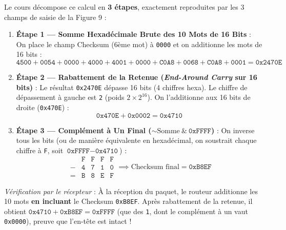 \documentclass[11pt,a4paper]{article}
\begin{document}
Le cours décompose ce calcul en \textbf{3 étapes}, exactement reproduites par les 3 champs de saisie de la Figure 9 :
\begin{enumerate}
    \item \textbf{Étape 1 — Somme Hexadécimale Brute des 10 Mots de 16 Bits} :
    On place le champ Checksum (6ème mot) à \texttt{0000} et on additionne les mots de 16 bits :
    $$\texttt{4500} + \texttt{0054} + \texttt{0000} + \texttt{4000} + \texttt{4001} + \texttt{0000} + \texttt{C0A8} + \texttt{0068} + \texttt{C0A8} + \texttt{0001} = \mathbf{\texttt{0x2470E}}$$
    \item \textbf{Étape 2 — Rabattement de la Retenue (\textit{End-Around Carry} sur 16 bits)} :
    Le résultat \texttt{0x2470E} dépasse 16 bits (4 chiffres hexa). Le chiffre de dépassement à gauche est \texttt{2} (poids $2 \times 2^{16}$). On l'additionne aux 16 bits de droite (\texttt{0x470E}) :
    $$\texttt{0x470E} + \texttt{0x0002} = \mathbf{\texttt{0x4710}}$$
    \item \textbf{Étape 3 — Complément à Un Final ($\sim\text{Somme} \ \& \ \texttt{0xFFFF}$)} :
    On inverse tous les bits (ou de manière équivalente en hexadécimal, on soustrait chaque chiffre à \texttt{F}, soit $\texttt{0xFFFF} - \texttt{0x4710}$) :
    $$\begin{array}{cccccc}
      & \texttt{F} & \texttt{F} & \texttt{F} & \texttt{F} \\
    - & \texttt{4} & \texttt{7} & \texttt{1} & \texttt{0} \\
    \hline
    = & \mathbf{\texttt{B}} & \mathbf{\texttt{8}} & \mathbf{\texttt{E}} & \mathbf{\texttt{F}}
    \end{array}
    \implies \text{Checksum final} = \mathbf{\texttt{0xB8EF}}$$
\end{enumerate}
\textit{Vérification par le récepteur} : À la réception du paquet, le routeur additionne les 10 mots \textbf{en incluant} le Checksum \texttt{0xB8EF}. Après rabattement de la retenue, il obtient $\texttt{0x4710} + \texttt{0xB8EF} = \texttt{0xFFFF}$ (que des \texttt{1}, dont le complément à un vaut \texttt{0x0000}), preuve que l'en-tête est intact !
\end{document}
